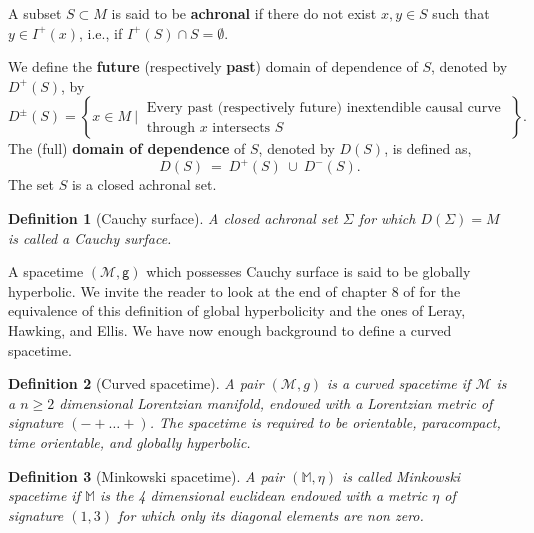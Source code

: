 \documentclass[12pt]{book}
\newcommand{\Mcal}{\mathcal{M}}
\newcommand{\Mbb}{\mathbb{M}}
\newcommand{\gsf}{\mathsf{g}}
\theoremstyle{break}
\newtheorem{definition}{Definition}
\begin{document}


A subset $S \subset M$ is said to be \textbf{achronal} if there do not exist $x, y \in S$ such that $y \in I^{+}(x)$, i.e., if $I^{+}(S) \cap S = \emptyset$. 




We define the \textbf{future} (respectively \textbf{past}) domain of dependence of $S$, denoted by $D^{+}(S)$, by
%
\begin{equation*}
D^{\pm}(S) = \left\{ x \in M \ \bigg| \ \begin{array}{l} \text{Every past (respectively future) inextendible causal curve} \\ \text{through $x$ intersects $S$} \end{array} \; \right\}.
\end{equation*}
%
The (full) \textbf{domain of dependence} of $S$, denoted by $D(S)$, is defined as,
\begin{equation*}
D(S) \ = \ D^{+}(S) \ \cup \ D^{-}(S).
\end{equation*}
The set $S$ is a closed achronal set.




\begin{definition}[Cauchy surface]
A closed achronal set $\Sigma$ for which $D(\Sigma) = M$ is called a Cauchy surface. 
\end{definition}

A spacetime $(\Mcal,\gsf)$ which possesses Cauchy surface is said to be globally hyperbolic. We invite the reader to look at the end of chapter $8$ of \cite{waldGR} for the equivalence of this definition of global hyperbolicity and the ones of Leray, Hawking, and Ellis. 
We have now enough background to define a curved spacetime.

\begin{definition}[Curved spacetime]\label{def:cst}
A pair $(\Mcal,g)$ is a curved spacetime if $\Mcal$ is a $n \geq 2$ dimensional Lorentzian manifold, endowed with a Lorentzian metric of signature $( - + \dots +)$. The spacetime is required to be orientable, paracompact, time orientable, and globally hyperbolic. 
\end{definition}


\begin{definition}[Minkowski spacetime]
A pair $(\Mbb,\eta)$ is called Minkowski spacetime if $\Mbb$ is the 4 dimensional euclidean endowed with a metric $\eta$ of signature $(1,3)$ for which only its diagonal elements are non zero.
\end{definition}
\end{document}
